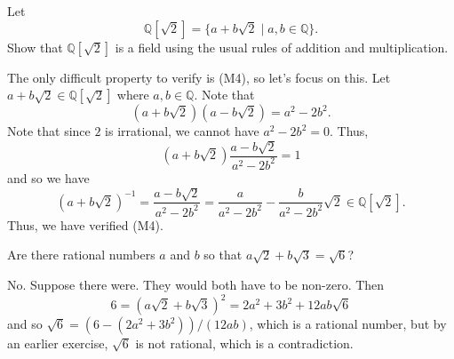 \documentclass[11pt,dvipsnames]{book}
\numberwithin{figure}{section} %
\numberwithin{table}{section} %
\begin{document}
\begin{exercise}
Let 
\[
\mathbb{Q}[\sqrt{2}] = \{a+b\sqrt{2}\; |\; a,b\in\mathbb{Q}\}.
\]
Show that $\mathbb{Q}[\sqrt{2}] $ is a field using the usual rules of addition and multiplication. 
\end{exercise}

\begin{solution}
The only difficult property to verify is (M4), so let's focus on this. Let $a+b\sqrt{2}\in \mathbb{Q}[\sqrt{2}]$ where $a,b\in\mathbb{Q}$. Note that 
\[
(a+b\sqrt{2})(a-b\sqrt{2})=a^2-2b^2. 
\]
Note that since $2$ is irrational, we cannot have $a^2-2b^2=0$. Thus,
\[
(a+b\sqrt{2}) \frac{a-b\sqrt{2}}{a^2-2b^2}=1
\]
and so we have 
\[
(a+b\sqrt{2})^{-1}
=\frac{a-b\sqrt{2}}{a^2-2b^2}
=\frac{a}{a^2-2b^2}-\frac{b}{a^2-2b^2}\sqrt{2} \in\mathbb{Q}[\sqrt{2}].\]
Thus, we have verified (M4).
\end{solution}


\begin{exercise}
Are there rational numbers $a$ and $b$ so that $a\sqrt{2}+b\sqrt{3}=\sqrt{6}$?
\begin{solution}
No. Suppose there were. They would both have to be non-zero. Then
\[
6=(a\sqrt{2}+b\sqrt{3})^2=2a^2+3b^2+12ab\sqrt{6}
\]
and so $\sqrt{6} = (6-(2a^2+3b^2))/(12ab)$, which is a rational number, but by an earlier exercise, $\sqrt{6}$ is not rational, which is a contradiction.
\end{solution}
\end{exercise}
\end{document}
